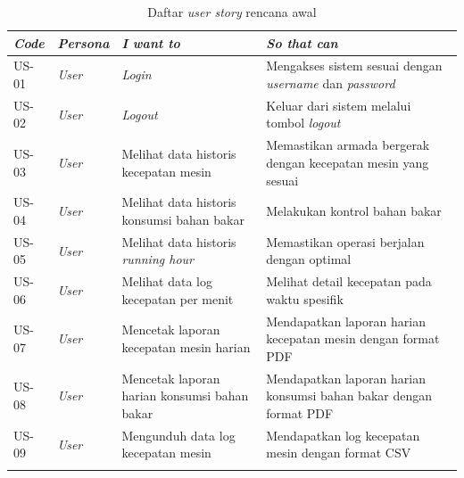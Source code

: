     \begin{longtable}[!h]
        {
            p{}
            p{}
            p{}
            p{}
        }
        \caption{Daftar \textit{user story} rencana awal} \\

            \toprule
            \textit{Code} &
            \textit{Persona} &
            \textit{I want to} &
            \textit{So that can} \\ [0.5ex]
            \midrule

            US-01 &
            \textit{User} &
            \textit{Login} &
            Mengakses sistem sesuai dengan \textit{username} dan \textit{password}
            \\

            US-02 &
            \textit{User} &
            \textit{Logout} &
            Keluar dari sistem melalui tombol \textit{logout} \\

            US-03 &
            \textit{User} &
            Melihat data historis kecepatan mesin &
            Memastikan armada bergerak dengan kecepatan mesin yang sesuai
            \\

            US-04 &
            \textit{User} &
            Melihat data historis konsumsi bahan bakar &
            Melakukan kontrol bahan bakar
            \\

            US-05 &
            \textit{User} &
            Melihat data historis \textit{running hour} &
            Memastikan operasi berjalan dengan optimal
            \\

            US-06 &
            \textit{User} &
            Melihat data log kecepatan per menit &
            Melihat detail kecepatan pada waktu spesifik
            \\

            US-07 &
            \textit{User} &
            Mencetak laporan kecepatan mesin harian &
            Mendapatkan laporan harian kecepatan mesin dengan format PDF
            \\

            US-08 &
            \textit{User} &
            Mencetak laporan harian konsumsi bahan bakar &
            Mendapatkan laporan harian konsumsi bahan bakar dengan format PDF
            \\

            US-09 &
            \textit{User} &
            Mengunduh data log kecepatan mesin &
            Mendapatkan log kecepatan mesin dengan format CSV
            \\ [1ex]
            \bottomrule
        \label{tab:user-story}
    \end{longtable}

